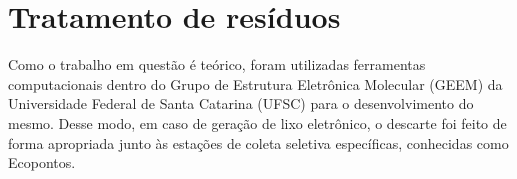 \section{Tratamento de resíduos}

Como o trabalho em questão é teórico, foram utilizadas ferramentas computacionais dentro do Grupo de Estrutura Eletrônica Molecular (GEEM) da Universidade Federal de Santa Catarina (UFSC) para o desenvolvimento do mesmo. Desse modo, em caso de geração de lixo eletrônico, o descarte foi feito de forma apropriada junto às estações de coleta seletiva específicas, conhecidas como Ecopontos.